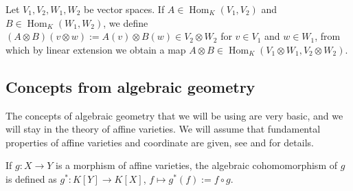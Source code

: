 \vspace{0.1cm}
Let $V_1,V_2,W_1,W_2$ be vector spaces.
If $A \in \operatorname{Hom}_K(V_1,V_2)$ and \linebreak$B \in \operatorname{Hom}_K(W_1,W_2)$, we define $(A\otimes B)(v\otimes w) := A(v)\otimes B(w) \in V_2 \otimes W_2$ for $v \in V_1$ and $w \in W_1$, from which by linear extension we obtain a map $A \otimes B \in \operatorname{Hom}_K(V_1\otimes W_1,V_2\otimes W_2)$.

\subsection{Concepts from algebraic geometry}

The concepts of algebraic geometry that we will be using are very basic, and we will stay in the theory of affine varieties.
We will assume that fundamental properties of affine varieties and coordinate are given, see \cite[p.~1-2]{DK15} and \cite{Gat17} for details.

\vspace{0.2cm}

  If $g \colon X \rightarrow Y$ is a morphism of affine varieties, the algebraic cohomomorphism of $g$ is defined as $g^\ast \colon K[Y] \rightarrow K[X]$, $f\mapsto g^\ast(f) := f \circ g$.
  
